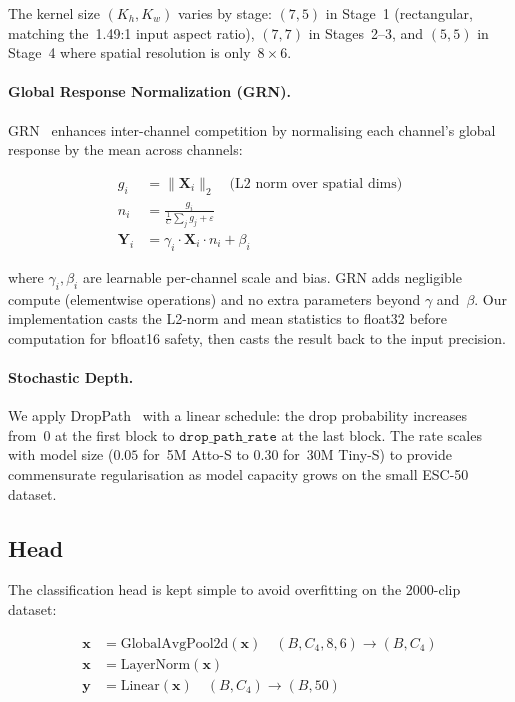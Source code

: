 \documentclass{article}
\begin{document}
The kernel size $(K_h, K_w)$ varies by stage: $(7,5)$ in Stage~1 (rectangular,
matching the~1.49:1 input aspect ratio), $(7,7)$ in Stages~2--3, and $(5,5)$ in
Stage~4 where spatial resolution is only~$8\times6$.

\paragraph{Global Response Normalization (GRN).}
GRN~\cite{woo2023convnextv2} enhances inter-channel competition by
normalising each channel's global response by the mean across channels:

\begin{align}
  g_i &= \|\mathbf{X}_i\|_2 \quad \text{(L2 norm over spatial dims)} \label{eq:grn_norm}\\
  n_i &= \frac{g_i}{\frac{1}{C}\sum_{j} g_j + \varepsilon} \label{eq:grn_ratio}\\
  \mathbf{Y}_i &= \gamma_i \cdot \mathbf{X}_i \cdot n_i + \beta_i \label{eq:grn_apply}
\end{align}

where $\gamma_i, \beta_i$ are learnable per-channel scale and bias. GRN adds
negligible compute (elementwise operations) and no extra parameters beyond
$\gamma$ and~$\beta$. Our implementation casts the L2-norm and mean statistics
to float32 before computation for bfloat16 safety, then casts the result back
to the input precision.

\paragraph{Stochastic Depth.}
We apply DropPath~\cite{huang2016stochasticdepth} with a linear schedule:
the drop probability increases from~0 at the first block to
$\texttt{drop\_path\_rate}$ at the last block. The rate scales with model size
($0.05$ for~5M Atto-S to $0.30$ for~30M Tiny-S) to provide commensurate
regularisation as model capacity grows on the small ESC-50 dataset.

\subsection{Head}

The classification head is kept simple to avoid overfitting on the 2000-clip
dataset:

\begin{align}
  \mathbf{x} &= \text{GlobalAvgPool2d}(\mathbf{x}) \quad (B, C_4, 8, 6) \rightarrow (B, C_4)\\
  \mathbf{x} &= \text{LayerNorm}(\mathbf{x})\\
  \mathbf{y} &= \text{Linear}(\mathbf{x}) \quad (B, C_4) \rightarrow (B, 50)
\end{align}
\end{document}
